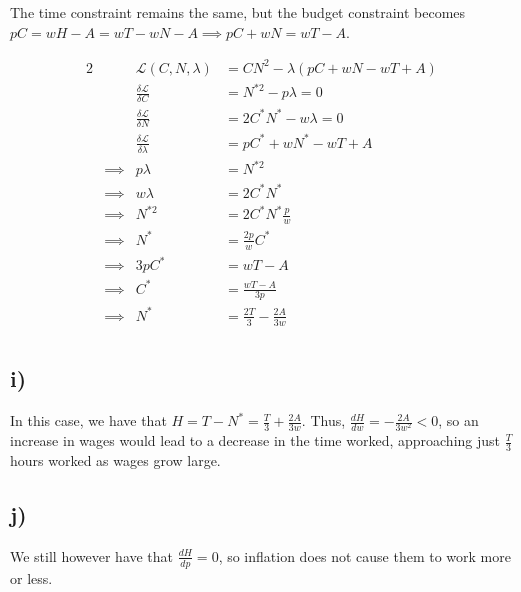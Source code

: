 \documentclass[12pt,letterpaper]{article}
\theoremstyle{definition}
\newcommand{\Lag}{\mathcal{L}}
\begin{document}
The time constraint remains the same, but the budget constraint becomes $pC = wH
- A = wT - wN - A \implies pC + wN = wT - A$.


\begin{alignat*}{2}
  && \Lag(C,N,\lambda) &= CN^2 - \lambda(pC + wN - wT + A) \\
  && \frac{\delta \Lag}{\delta C} &= N^{*2} - p\lambda = 0\\ 
  && \frac{\delta \Lag}{\delta N} &= 2C^*N^* - w\lambda = 0\\ 
  && \frac{\delta \Lag}{\delta \lambda} &= pC^* + wN^* - wT + A\\ 
  &\implies& p\lambda &= N^{*2} \\
  &\implies& w\lambda &= 2C^*N^* \\
  &\implies& N^{*2} &= 2C^*N^*\frac{p}{w} \\
  &\implies& N^* &= \frac{2p}{w} C^* \\
  &\implies& 3pC^* &= wT - A\\
  &\implies& C^* &= \frac{wT - A}{3p} \\
  &\implies& N^* &= \frac{2T}{3} - \frac{2A}{3w} \\
\end{alignat*}


\subsection*{i)}

In this case, we have that $H = T - N^* = \frac{T}{3} + \frac{2A}{3w}$. Thus,
$\frac{dH}{dw} = -\frac{2A}{3w^2} < 0$, so an increase in wages would lead to a
decrease in the time worked, approaching just $\frac{T}{3}$ hours worked as
wages grow large.

\subsection*{j)}

We still however have that $\frac{dH}{dp} = 0$, so inflation does not cause them
to work more or less.
\end{document}
